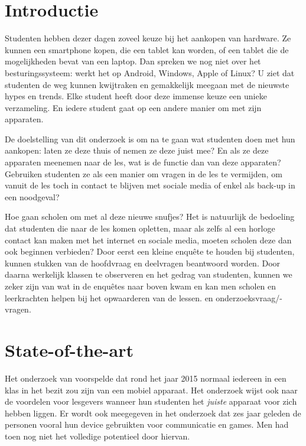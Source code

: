 
\section{Introductie} %
\label{sec:introductie}

Studenten hebben dezer dagen zoveel keuze bij het aankopen van hardware. Ze kunnen een smartphone kopen, die een tablet kan worden, of een tablet die de mogelijkheden bevat van een laptop. Dan spreken we nog niet over het besturingssysteem: werkt het op Android, Windows, Apple of Linux? U ziet dat studenten de weg kunnen kwijtraken en gemakkelijk meegaan met de nieuwste hypes en trends. Elke student heeft door deze immense keuze een unieke verzameling. En iedere student gaat op een andere manier om met zijn apparaten.

De doelstelling van dit onderzoek is om na te gaan wat studenten doen met hun aankopen: laten ze deze thuis of nemen ze deze juist mee? En als ze deze apparaten meenemen naar de les, wat is de functie dan van deze apparaten? Gebruiken studenten ze als een manier om vragen in de les te vermijden, om vanuit de les toch in contact te blijven met sociale media of enkel als back-up in een noodgeval?

Hoe gaan scholen om met al deze nieuwe snufjes? Het is natuurlijk de bedoeling dat studenten die naar de les komen opletten, maar als zelfs al een horloge contact kan maken met het internet en sociale media, moeten scholen deze dan ook beginnen verbieden? Door eerst een kleine enquête te houden bij studenten, kunnen stukken van de hoofdvraag en deelvragen beantwoord worden. Door daarna werkelijk klassen te observeren en het gedrag van studenten, kunnen we zeker zijn van wat in de enquêtes naar boven kwam en kan men scholen en leerkrachten helpen bij het opwaarderen van de lessen. en onderzoeksvraag/-vragen.

\section{State-of-the-art}
\label{sec:state-of-the-art}

Het onderzoek van \textcite{3} voorspelde dat rond het jaar 2015 normaal iedereen in een klas in het bezit zou zijn van een mobiel apparaat. Het onderzoek wijst ook naar de voordelen voor lesgevers wanneer hun studenten het \emph{juiste} apparaat voor zich hebben liggen. Er wordt ook meegegeven in het onderzoek dat zes jaar geleden de personen vooral hun device gebruikten voor communicatie en games. Men had toen nog niet het volledige potentieel door hiervan. 

